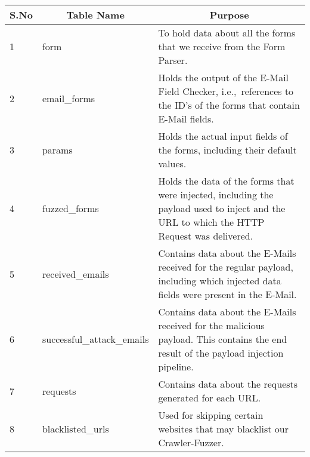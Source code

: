\begin{tabular}{|p{1cm}|p{5cm}|p{8cm}|}
	\hline
	\multicolumn{1}{|c|}{\textbf{S.No}} & \multicolumn{1}{c}{\textbf{Table Name}} & 
	\multicolumn{1}{|c|}{\textbf{Purpose}}\\
	\hline
	1 & form & To hold data about all the forms that we receive from the Form Parser.\\
	\hline
	2 & {{email\_forms}} & Holds the output of the E-Mail Field Checker, i.e.,\ references to the ID's of the forms that contain E-Mail fields. \\
	\hline
	3 & params & Holds the actual input fields of the forms, including their default values.\\
	\hline
	4 & {{fuzzed\_forms}} & Holds the data of the forms that were injected, including the payload used to inject and the URL to which the HTTP Request was delivered.\\
	\hline
	5 & {{received\_emails}} & Contains data about the E-Mails received for the regular payload, including which injected data fields were present in the E-Mail.\\
	\hline
	6 & {{successful\_attack\_emails}} & Contains data about the E-Mails received for the malicious payload. This contains the end result of the payload injection pipeline.\\
	\hline
	7 & requests & Contains data about the requests generated for each URL.\\
	\hline
	8 & {{blacklisted\_urls}} & Used for skipping certain websites that may blacklist our Crawler-Fuzzer.\\
	\hline
\end{tabular}